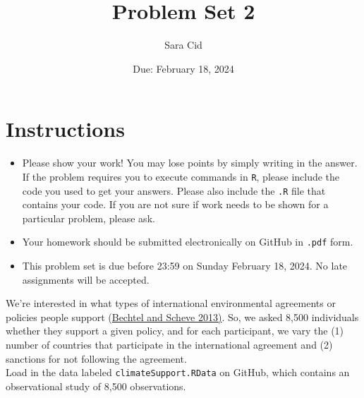 \documentclass[12pt,letterpaper]{article}
\title{Problem Set 2}
\date{Due: February 18, 2024}
\author{Sara Cid}
\begin{document}
	\maketitle
	\section*{Instructions}
	\begin{itemize}
		\item Please show your work! You may lose points by simply writing in the answer. If the problem requires you to execute commands in \texttt{R}, please include the code you used to get your answers. Please also include the \texttt{.R} file that contains your code. If you are not sure if work needs to be shown for a particular problem, please ask.
		\item Your homework should be submitted electronically on GitHub in \texttt{.pdf} form.
		\item This problem set is due before 23:59 on Sunday February 18, 2024. No late assignments will be accepted.
	\end{itemize}


	\vspace{.25cm}
\noindent We're interested in what types of international environmental agreements or policies people support (\href{https://www.pnas.org/content/110/34/13763}{Bechtel and Scheve 2013)}. So, we asked 8,500 individuals whether they support a given policy, and for each participant, we vary the (1) number of countries that participate in the international agreement and (2) sanctions for not following the agreement. \\

\noindent Load in the data labeled \texttt{climateSupport.RData} on GitHub, which contains an observational study of 8,500 observations.
\end{document}
